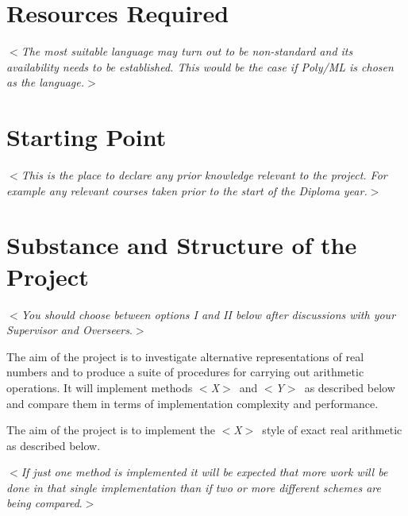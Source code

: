 \documentclass[12pt]{article}
\newcommand{\al}{$<$}
\newcommand{\ar}{$>$}
\begin{document}
\section*{Resources Required}

\al\emph{The most suitable language may turn out to be non-standard
  and its availability needs to be established.  This would be the
  case if Poly/ML is chosen as the language.}\ar


\section*{Starting Point}

\al\emph{This is the place to declare any prior knowledge relevant to
  the project.  For example any relevant courses taken prior to the
  start of the Diploma year.}\ar


\section*{Substance and Structure of the Project}

\al\emph{You should choose between options I and II below after
  discussions with your Supervisor and Overseers}.\ar

\begin{list}
{}{}

\item The aim of the project is to investigate alternative
representations of real numbers and to produce a suite of procedures
for carrying out arithmetic operations.  It will implement methods
\al\emph{X\/}\ar\ and \al\emph{Y\/}\ar\ as described below and compare them
in terms of implementation complexity and performance.

\item The aim of the project is to implement the \al\emph{X\/}\ar\
style of exact real arithmetic as described below.

\end{list}

\medskip
\al\emph{If just one method is implemented it will be expected that
more work will be done in that single implementation than if two or
more different schemes are being compared}.\ar
\end{document}
